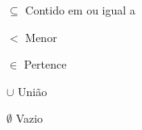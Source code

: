 \begin{simbolos}
  \item[$ \subseteq $] Contido em ou igual a
  \item[$ < $] Menor
  \item[$ \in $] Pertence
  \item[$ \cup $] União
  \item[$ \emptyset $] Vazio
\end{simbolos}
